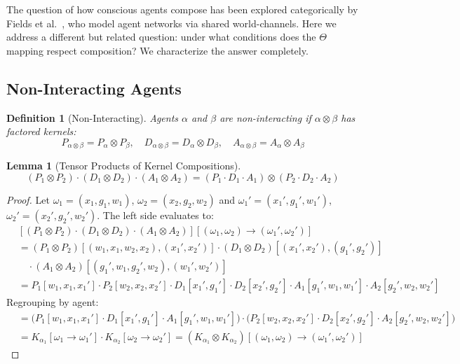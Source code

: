 \documentclass[11pt,a4paper]{article}
\newtheorem{lemma}[theorem]{Lemma}
\newtheorem{definition}[theorem]{Definition}
\begin{document}
The question of how conscious agents compose has been explored categorically by Fields et al.\ \cite{fields2018}, who model agent networks via shared world-channels. Here we address a different but related question: under what conditions does the $\Theta$ mapping respect composition? We characterize the answer completely.

\subsection{Non-Interacting Agents}

\begin{definition}[Non-Interacting]\label{def:nonint}
Agents $\alpha$ and $\beta$ are \emph{non-interacting} if $\alpha \otimes \beta$ has factored kernels:
\[
P_{\alpha \otimes \beta} = P_\alpha \otimes P_\beta, \quad D_{\alpha \otimes \beta} = D_\alpha \otimes D_\beta, \quad A_{\alpha \otimes \beta} = A_\alpha \otimes A_\beta
\]
\end{definition}

\begin{lemma}[Tensor Products of Kernel Compositions]\label{lem:tensor}
\[
(P_1 \otimes P_2) \cdot (D_1 \otimes D_2) \cdot (A_1 \otimes A_2) = (P_1 \cdot D_1 \cdot A_1) \otimes (P_2 \cdot D_2 \cdot A_2)
\]
\end{lemma}

\begin{proof}
Let $\omega_1 = (x_1, g_1, w_1)$, $\omega_2 = (x_2, g_2, w_2)$ and $\omega_1' = (x_1', g_1', w_1')$, $\omega_2' = (x_2', g_2', w_2')$. The left side evaluates to:
\begin{align*}
&[(P_1 \otimes P_2) \cdot (D_1 \otimes D_2) \cdot (A_1 \otimes A_2)][(\omega_1, \omega_2) \to (\omega_1', \omega_2')] \\
&= (P_1 \otimes P_2)[(w_1, x_1, w_2, x_2), (x_1', x_2')] \cdot (D_1 \otimes D_2)[(x_1', x_2'), (g_1', g_2')] \\
&\quad \cdot (A_1 \otimes A_2)[(g_1', w_1, g_2', w_2), (w_1', w_2')] \\
&= P_1[w_1, x_1, x_1'] \cdot P_2[w_2, x_2, x_2'] \cdot D_1[x_1', g_1'] \cdot D_2[x_2', g_2'] \cdot A_1[g_1', w_1, w_1'] \cdot A_2[g_2', w_2, w_2']
\end{align*}
Regrouping by agent:
\begin{align*}
&= \bigl(P_1[w_1, x_1, x_1'] \cdot D_1[x_1', g_1'] \cdot A_1[g_1', w_1, w_1']\bigr) \cdot \bigl(P_2[w_2, x_2, x_2'] \cdot D_2[x_2', g_2'] \cdot A_2[g_2', w_2, w_2']\bigr) \\
&= K_{\alpha_1}[\omega_1 \to \omega_1'] \cdot K_{\alpha_2}[\omega_2 \to \omega_2'] = (K_{\alpha_1} \otimes K_{\alpha_2})[(\omega_1, \omega_2) \to (\omega_1', \omega_2')]
\end{align*}
\end{proof}
\end{document}

